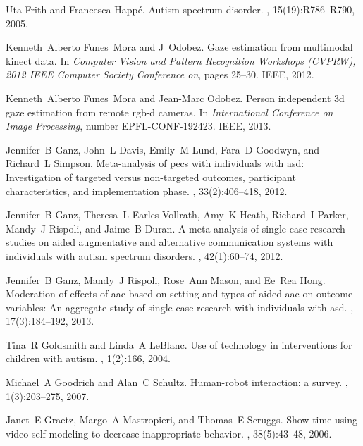 \documentclass{ut-thesis}
\begin{document}
\begin{thebibliography}{100}
Uta Frith and Francesca Happ{\'e}.
\newblock Autism spectrum disorder.
, 15(19):R786--R790, 2005.

Kenneth~Alberto Funes~Mora and J~Odobez.
\newblock Gaze estimation from multimodal kinect data.
\newblock In {\em Computer Vision and Pattern Recognition Workshops (CVPRW),
  2012 IEEE Computer Society Conference on}, pages 25--30. IEEE, 2012.

Kenneth~Alberto Funes~Mora and Jean-Marc Odobez.
\newblock Person independent 3d gaze estimation from remote rgb-d cameras.
\newblock In {\em International Conference on Image Processing}, number
  EPFL-CONF-192423. IEEE, 2013.

Jennifer~B Ganz, John~L Davis, Emily~M Lund, Fara~D Goodwyn, and Richard~L
  Simpson.
\newblock Meta-analysis of pecs with individuals with asd: Investigation of
  targeted versus non-targeted outcomes, participant characteristics, and
  implementation phase.
, 33(2):406--418, 2012.

Jennifer~B Ganz, Theresa~L Earles-Vollrath, Amy~K Heath, Richard~I Parker,
  Mandy~J Rispoli, and Jaime~B Duran.
\newblock A meta-analysis of single case research studies on aided augmentative
  and alternative communication systems with individuals with autism spectrum
  disorders.
, 42(1):60--74,
  2012.

Jennifer~B Ganz, Mandy~J Rispoli, Rose~Ann Mason, and Ee~Rea Hong.
\newblock Moderation of effects of aac based on setting and types of aided aac
  on outcome variables: An aggregate study of single-case research with
  individuals with asd.
, 17(3):184--192, 2013.

Tina~R Goldsmith and Linda~A LeBlanc.
\newblock Use of technology in interventions for children with autism.
, 1(2):166,
  2004.

Michael~A Goodrich and Alan~C Schultz.
\newblock Human-robot interaction: a survey.
,
  1(3):203--275, 2007.

Janet~E Graetz, Margo~A Mastropieri, and Thomas~E Scruggs.
\newblock Show time using video self-modeling to decrease inappropriate
  behavior.
, 38(5):43--48, 2006.


\end{thebibliography}
\end{document}
